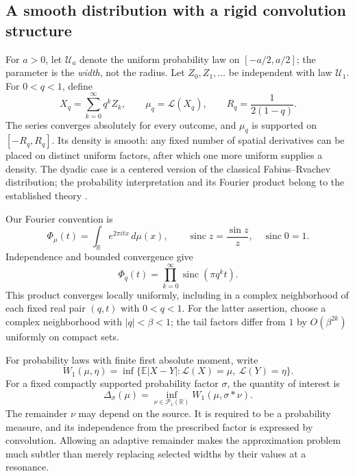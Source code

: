 \documentclass[11pt,letterpaper]{article}
\theoremstyle{definition}
\theoremstyle{remark}
\newcommand{\R}{\mathbb R}
\newcommand{\E}{\mathbb E}
\newcommand{\Un}{\mathcal U}
\newcommand{\Law}{\mathcal L}
\newcommand{\Pone}{\mathcal P_1(\R)}
\newcommand{\sinc}{\operatorname{sinc}}
\begin{document}
\subsection{A smooth distribution with a rigid convolution structure}
For $a>0$, let $\Un_a$ denote the uniform probability law on $[-a/2,a/2]$; the parameter is the \emph{width}, not the radius. Let $Z_0,Z_1,\ldots$ be independent with law $\Un_1$. For $0<q<1$, define
\begin{equation}\label{eq:mu-def}
 X_q=\sum_{k=0}^{\infty}q^kZ_k,
 \qquad \mu_q=\Law(X_q),
 \qquad R_q=\frac{1}{2(1-q)}.
\end{equation}
The series converges absolutely for every outcome, and $\mu_q$ is supported on $[-R_q,R_q]$. Its density is smooth: any fixed number of spatial derivatives can be placed on distinct uniform factors, after which one more uniform supplies a density. The dyadic case is a centered version of the classical Fabius--Rvachev distribution; the probability interpretation and its Fourier product belong to the established theory \cite{Arias}.

Our Fourier convention is
\begin{equation}\label{eq:fourier-convention}
 \Phi_\mu(t)=\int_{\R}e^{2\pi itx}\,d\mu(x),\qquad
 \sinc z=\frac{\sin z}{z},\quad \sinc0=1.
\end{equation}
Independence and bounded convergence give
\begin{equation}\label{eq:fourier-product}
 \Phi_q(t)=\prod_{k=0}^{\infty}\sinc(\pi q^kt).
\end{equation}
This product converges locally uniformly, including in a complex neighborhood of each fixed real pair $(q,t)$ with $0<q<1$. For the latter assertion, choose a complex neighborhood with $|q|<\beta<1$; the tail factors differ from $1$ by $O(\beta^{2k})$ uniformly on compact sets.

For probability laws with finite first absolute moment, write
\[
 W_1(\mu,\eta)=\inf\{\E|X-Y|:\Law(X)=\mu,\ \Law(Y)=\eta\}.
\]
For a fixed compactly supported probability factor $\sigma$, the quantity of interest is
\begin{equation}\label{eq:Delta-general}
 \Delta_\sigma(\mu)=\inf_{\nu\in\Pone}W_1(\mu,\sigma*\nu).
\end{equation}
The remainder $\nu$ may depend on the source. It is required to be a probability measure, and its independence from the prescribed factor is expressed by convolution. Allowing an adaptive remainder makes the approximation problem much subtler than merely replacing selected widths by their values at a resonance.
\end{document}
